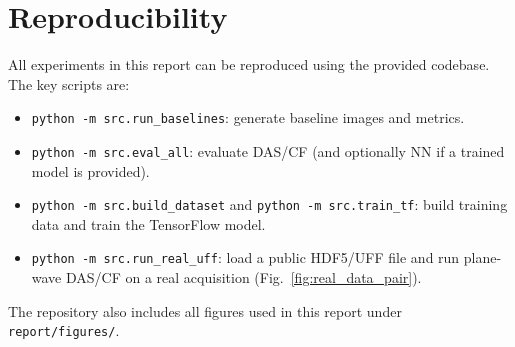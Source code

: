 \documentclass[conference]{IEEEtran}
\begin{document}
\section{Reproducibility}
All experiments in this report can be reproduced using the provided codebase. The key scripts are:
\begin{itemize}
    \item \texttt{python -m src.run\_baselines}: generate baseline images and metrics.
    \item \texttt{python -m src.eval\_all}: evaluate DAS/CF (and optionally NN if a trained model is provided).
    \item \texttt{python -m src.build\_dataset} and \texttt{python -m src.train\_tf}: build training data and train the TensorFlow model.
    \item \texttt{python -m src.run\_real\_uff}: load a public HDF5/UFF file and run plane-wave DAS/CF on a real acquisition (Fig.~\ref{fig:real_data_pair}).
\end{itemize}
The repository also includes all figures used in this report under \texttt{report/figures/}.
\end{document}
